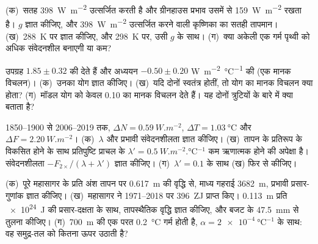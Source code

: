 \begin{exercise}[$\star\star$]\label{exo:b2:anthropogenic-climate-change:5}
(क)~सतह \qty{398}{W.m^{-2}} उत्सर्जित करती है और ग्रीनहाउस प्रभाव उसमें से \qty{159}{W.m^{-2}}
रखता है। $g$ ज्ञात कीजिए, और \qty{398}{W.m^{-2}} उत्सर्जित करने वाली कृष्णिका का सतही तापमान। (ख)~\qty{288}{K}
पर  ज्ञात कीजिए, और \qty{298}{K} पर, उसी $g$ के साथ। (ग)~क्या अकेली  एक गर्म पृथ्वी को अधिक संवेदनशील बनाएगी या कम?
\end{exercise}

\begin{exercise}[$\star\star$]\label{exo:b2:anthropogenic-climate-change:6}
उपग्रह $1.85 \pm 0.32$ की  देते हैं और अध्ययन $-0.50 \pm 0.20$ \unit{W.m^{-2}.\celsius^{-1}}
की  (एक मानक विचलन)। (क)~उनका योग ज्ञात कीजिए।
(ख)~यदि दोनों स्वतंत्र होतीं, तो योग का मानक विचलन क्या होता? (ग)~मॉडल
योग को केवल \num{0.10} का मानक विचलन देते हैं। यह दोनों त्रुटियों के बारे में क्या बताता है?
\end{exercise}

\begin{exercise}[$\star\star$]\label{exo:b2:anthropogenic-climate-change:7}
1850--1900 से 2006--2019 तक, $\Delta N = \qty{0.59}{W.m^{-2}}$, $\Delta T = \qty{1.03}{\celsius}$
और $\Delta F = \qty{2.20}{W.m^{-2}}$। (क)~$\lambda$ और प्रभावी संवेदनशीलता ज्ञात कीजिए। (ख)~तापन के
प्रतिरूप के विकसित होने के साथ प्रतिपुष्टि प्राचल के $\lambda' = \qty{0.5}{W.m^{-2}.\celsius^{-1}}$ कम
ऋणात्मक होने की अपेक्षा है। संवेदनशीलता $-F_{2\times}/(\lambda + \lambda')$ ज्ञात कीजिए।
(ग)~$\lambda' = 0.1$ के साथ (ख) फिर से कीजिए।
\end{exercise}

\begin{exercise}[$\star\star$]\label{exo:b2:anthropogenic-climate-change:8}
(क)~पूरे महासागर के प्रति अंश तापन पर \qty{0.617}{m} की वृद्धि से, माध्य गहराई
\qty{3682}{m}, प्रभावी प्रसार-गुणांक ज्ञात कीजिए। (ख)~महासागर ने 1971--2018 पर \qty{396}{ZJ}
प्राप्त किए। \qty{0.113}{m} प्रति \qty{e24}{J} की प्रसार-दक्षता के साथ, तापस्थैतिक
वृद्धि ज्ञात कीजिए, और बजट के \qty{47.5}{mm} से तुलना कीजिए। (ग)~\qty{700}{m} की एक परत
\qty{0.2}{\celsius} गर्म होती है, $\alpha = \qty{2e-4}{\celsius^{-1}}$ के साथ: वह समुद्र-तल को कितना ऊपर उठाती है?
\end{exercise}

